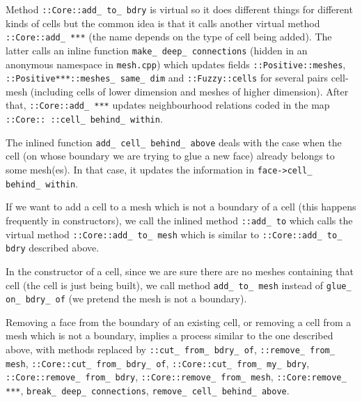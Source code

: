 Method {\small\tt{}::Core::add\_\,to\_\,bdry} is virtual so it does different things for
different kinds of cells but the common idea is that it calls another virtual method
{\small\tt{}::Core::add\_\,***} (the name depends on the type of cell being added).
The latter calls an inline function {\small\tt make\_\,deep\_\,connections} (hidden in an anonymous
namespace in {\small\tt mesh.cpp}) which updates fields
{\small\tt{}::Positive::meshes}, {\small\tt{}::Positive***::meshes\_\,same\_\,dim} and
{\small\tt{}::Fuzzy::cells} for several pairs cell-mesh
(including cells of lower dimension and meshes of higher dimension).
After that, {\small\tt{}::Core::add\_\,***} updates neighbourhood relations
coded in the map {\small\tt{}::Core:: ::cell\_\,behind\_\,within}.

The inlined function {\small\tt add\_\,cell\_\,behind\_\,above} deals with
the case when the cell (on whose boundary we are trying to glue a new face)
already belongs to some mesh(es).
In that case, it updates the information in {\small\tt face->cell\_\,behind\_\,within}.

If we want to add a cell to a mesh which is not a boundary of a cell (this happens
frequently in {\small\tt{}} constructors),
we call the inlined method {\small\tt{}::add\_\,to} which calls the virtual method
{\small\tt{}::Core::add\_\,to\_\,mesh} which is similar to
{\small\tt{}::Core::add\_\,to\_\,bdry} described above.

In the constructor of a cell, since we are sure there are no meshes containing that cell
(the cell is just being built),
we call method {\small\tt add\_\,to\_\,mesh} instead of {\small\tt glue\_\,on\_\,bdry\_\,of}
(we pretend the mesh is not a boundary).

Removing a face from the boundary of an existing cell, or removing a cell from a mesh
which is not a boundary, implies a process similar to the one described above,
with methods replaced by {\small\tt{}::cut\_\,from\_\,bdry\_\,of},
{\small\tt{}::remove\_\,from\_\,mesh},
{\small\tt{}::Core::cut\_\,from\_\,bdry\_\,of},
{\small\tt{}::Core::cut\_\,from\_\,my\_\,bdry},
{\small\tt{}::Core::remove\_\,from\_\,bdry}, {\small\tt{}::Core::remove\_\,from\_\,mesh},
{\small\tt{}::Core:remove\_\,***}, {\small\tt break\_\,deep\_\,connections},
{\small\tt remove\_\,cell\_\,behind\_\,above}.

